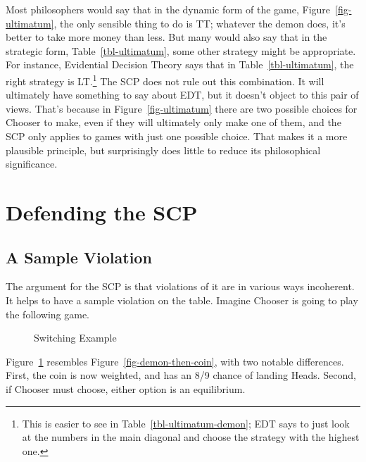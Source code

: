 \documentclass[
  10pt,
  letterpaper,
  DIV=11,
  numbers=noendperiod,
  twoside]{scrartcl}
\begin{document}
Most philosophers would say that in the dynamic form of the game,
Figure~\ref{fig-ultimatum}, the only sensible thing to do is TT;
whatever the demon does, it's better to take more money than less. But
many would also say that in the strategic form,
Table~\ref{tbl-ultimatum}, some other strategy might be appropriate. For
instance, Evidential Decision Theory says that in
Table~\ref{tbl-ultimatum}, the right strategy is LT.\footnote{This is
  easier to see in Table~\ref{tbl-ultimatum-demon}; EDT says to just
  look at the numbers in the main diagonal and choose the strategy with
  the highest one.} The SCP does not rule out this combination. It will
ultimately have something to say about EDT, but it doesn't object to
this pair of views. That's because in Figure~\ref{fig-ultimatum} there
are two possible choices for Chooser to make, even if they will
ultimately only make one of them, and the SCP only applies to games with
just one possible choice. That makes it a more plausible principle, but
surprisingly does little to reduce its philosophical significance.

\section{Defending the SCP}\label{sec-scp-defence}

\subsection{A Sample Violation}\label{sec-sample-violation}

The argument for the SCP is that violations of it are in various ways
incoherent. It helps to have a sample violation on the table. Imagine
Chooser is going to play the following game.

\begin{figure}


\caption{\label{fig-sample-violation}Switching Example}

\end{figure}%

Figure~\ref{fig-sample-violation} resembles
Figure~\ref{fig-demon-then-coin}, with two notable differences. First,
the coin is now weighted, and has an 8/9 chance of landing Heads.
Second, if Chooser must choose, either option is an equilibrium.
\end{document}
